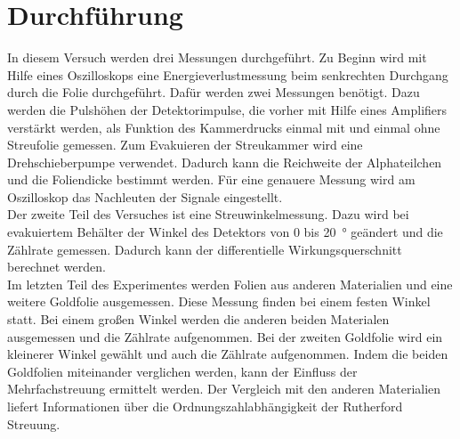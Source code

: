 \section{Durchführung}
In diesem Versuch werden drei Messungen durchgeführt.
Zu Beginn wird mit Hilfe eines Oszilloskops eine Energieverlustmessung beim
senkrechten Durchgang durch die Folie durchgeführt. Dafür werden zwei Messungen
benötigt. Dazu werden die Pulshöhen der Detektorimpulse, die vorher mit Hilfe
eines Amplifiers verstärkt werden, als Funktion des Kammerdrucks einmal mit und
einmal ohne Streufolie gemessen. Zum Evakuieren der Streukammer wird eine
Drehschieberpumpe verwendet. Dadurch kann die Reichweite der Alphateilchen und
die Foliendicke bestimmt werden. Für eine genauere Messung wird am Oszilloskop
das Nachleuten der Signale eingestellt. \\
Der zweite Teil des Versuches ist eine Streuwinkelmessung. Dazu wird bei
evakuiertem Behälter der Winkel des Detektors von $0$ bis \SI{20}{\degree}
geändert und die Zählrate gemessen. Dadurch kann der differentielle
Wirkungsquerschnitt berechnet werden. \\
Im letzten Teil des Experimentes werden Folien aus anderen Materialien und eine
weitere Goldfolie ausgemessen. Diese Messung finden bei einem festen Winkel statt.
Bei einem großen Winkel werden die anderen beiden Materialen ausgemessen und die
Zählrate aufgenommen. Bei der zweiten Goldfolie wird ein kleinerer Winkel
gewählt und auch die Zählrate aufgenommen. Indem die beiden Goldfolien miteinander
verglichen werden, kann der Einfluss der Mehrfachstreuung ermittelt werden. Der
Vergleich mit den anderen Materialien liefert Informationen über die
Ordnungszahlabhängigkeit der Rutherford Streuung.
